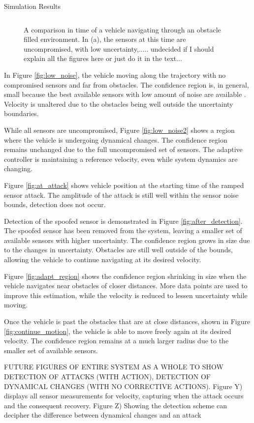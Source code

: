 \begin{section}{Simulation Results}
\begin{figure}[b!th]
\begin{tabular}{ccc}
\end{tabular}
\caption{A comparison in time of a vehicle navigating through an obstacle filled environment. In (a), the sensors at this time are uncompromised, with low uncertainty,..... undecided if I should explain all the figures here or just do it in the text... }

\end{figure}

In Figure \ref{fig:low_noise}, the vehicle moving along the trajectory with no compromised sensors and far from obstacles. The confidence region is, in general, small because the best available sensors with low amount of noise are available . Velocity is unaltered due to the obstacles being well outside the uncertainty boundaries.

While all sensors are uncompromised, Figure \ref{fig:low_noise2} shows a region where the vehicle is undergoing dynamical changes. The confidence region remains unchanged due to the full uncompromised set of sensors. The adaptive controller is maintaining a reference velocity, even while system dynamics are changing.

Figure \ref{fig:at_attack} shows vehicle position at the starting time of the ramped sensor attack. The amplitude of the attack is still well within the sensor noise bounds, detection does not occur.


Detection of the spoofed sensor is demonstrated in Figure \ref{fig:after_detection}. The spoofed sensor has been removed from the system, leaving a smaller set of available sensors with higher uncertainty. The confidence region grows in size due to the changes in uncertainty. Obstacles are still well outside of the bounds, allowing the vehicle to continue navigating at its desired velocity.

Figure \ref{fig:adapt_region} shows the confidence region shrinking in size when the vehicle navigates near obstacles of closer distances. More data points are used to improve this estimation, while the velocity is reduced to lessen uncertainty while moving.

Once the vehicle is past the obstacles that are at close distances, shown in Figure \ref{fig:continue_motion}, the vehicle is able to move freely again at its desired velocity. The confidence region remains at a much larger radius due to the smaller set of available sensors.




FUTURE FIGURES OF ENTIRE SYSTEM AS A WHOLE TO SHOW DETECTION OF ATTACKS (WITH ACTION), DETECTION OF DYNAMICAL CHANGES (WITH NO CORRECTIVE ACTIONS).
Figure Y) displays all sensor measurements for velocity, capturing when the attack occurs and the consequent recovery. 
Figure Z) Showing the detection scheme can decipher the difference between dynamical changes and an attack



\end{section}
